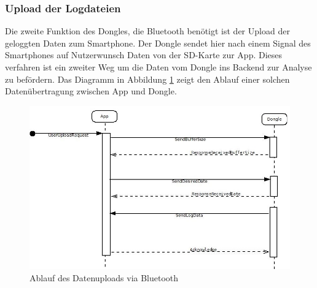\subsubsection{Upload der Logdateien}
Die zweite Funktion des Dongles, die Bluetooth benötigt ist der Upload der geloggten Daten zum Smartphone. Der Dongle sendet hier nach einem Signal des Smartphones auf Nutzerwunsch Daten von der SD-Karte zur App. Dieses verfahren ist ein zweiter Weg um die Daten vom Dongle ins Backend zur Analyse zu befördern. Das Diagramm in Abbildung \ref{fig:DataUpload} zeigt den Ablauf einer solchen Datenübertragung zwischen App und Dongle. 
\begin{figure}[h]
  \begin{center}
    \includegraphics[scale=0.6]{./img/DataUploadSequence.jpg}
    \caption{Ablauf des Datenuploads via Bluetooth}
    \label{fig:DataUpload}
  \end{center}
\end{figure}

